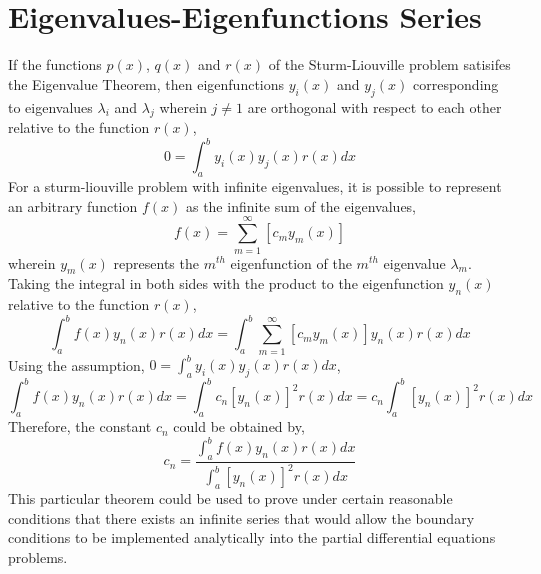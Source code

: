 \section{Eigenvalues-Eigenfunctions Series}
\begin{comment}
\end{comment}
If the functions $p(x)$, $q(x)$ and $r(x)$ of the Sturm-Liouville problem satisifes the Eigenvalue Theorem, then eigenfunctions $y_i(x)$ and $y_j(x)$ corresponding to eigenvalues $\lambda_i$ and $\lambda_j$ wherein $j\neq1$ are orthogonal with respect to each other relative to the function $r(x)$,
$$0 = \int^{b}_{a}y_i(x)y_j(x)r(x)dx$$
For a sturm-liouville problem with infinite eigenvalues, it is possible to represent an arbitrary function $f(x)$ as the infinite sum of the eigenvalues,
$$f(x) = \sum^{\infty}_{m=1}\left[c_my_m(x)\right]$$
wherein $y_m(x)$ represents the $m^{th}$ eigenfunction of the $m^{th}$ eigenvalue $\lambda_m$. Taking the integral in both sides with the product to the eigenfunction $y_n(x)$ relative to the function $r(x)$,
$$\int^{b}_{a}f(x)y_n(x)r(x)dx = \int^{b}_{a}\sum^{\infty}_{m=1}\left[c_my_m(x)\right]y_n(x)r(x)dx$$
Using the assumption, $\displaystyle{0 = \int^{b}_{a}y_i(x)y_j(x)r(x)dx}$,
$$\int^{b}_{a}f(x)y_n(x)r(x)dx = \int^{b}_{a}c_n\left[y_n(x)\right]^2r(x)dx = c_n\int^{b}_{a}\left[y_n(x)\right]^2r(x)dx$$
Therefore, the constant $c_n$ could be obtained by,
$$c_n = \frac{\displaystyle{\int^{b}_{a}f(x)y_n(x)r(x)dx}}{\displaystyle{\int^{b}_{a}\left[y_n(x)\right]^2r(x)dx}}$$
This particular theorem could be used to prove under certain reasonable conditions that there exists an infinite series that would allow the boundary conditions to be implemented analytically into the partial differential equations problems.
